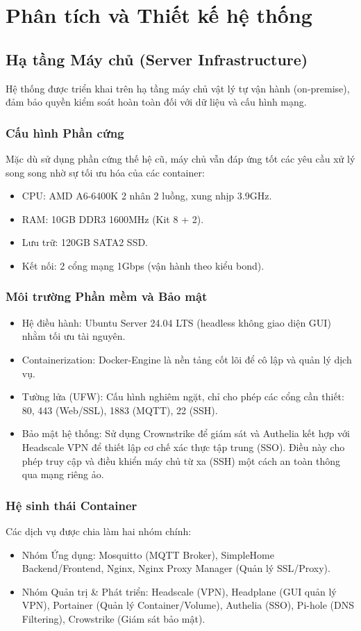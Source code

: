 \newpage
\section{Phân tích và Thiết kế hệ thống}

\subsection{Hạ tầng Máy chủ (Server Infrastructure)}
Hệ thống được triển khai trên hạ tầng máy chủ vật lý tự vận hành (on-premise), đảm bảo quyền kiểm soát hoàn toàn đối với dữ liệu và cấu hình mạng.
\subsubsection{Cấu hình Phần cứng}
Mặc dù sử dụng phần cứng thế hệ cũ, máy chủ vẫn đáp ứng tốt các yêu cầu xử lý song song nhờ sự tối ưu hóa của các container:
\begin{itemize}
    \item CPU: AMD A6-6400K 2 nhân 2 luồng, xung nhịp 3.9GHz.
    \item RAM: 10GB DDR3 1600MHz (Kit 8 + 2).
    \item Lưu trữ: 120GB SATA2 SSD.
    \item Kết nối: 2 cổng mạng 1Gbps (vận hành theo kiểu bond).
\end{itemize}
\subsubsection{Môi trường Phần mềm và Bảo mật}
\begin{itemize}
    \item Hệ điều hành: Ubuntu Server 24.04 LTS (headless không giao diện GUI) nhằm tối ưu tài nguyên.
    \item Containerization: Docker-Engine là nền tảng cốt lõi để cô lập và quản lý dịch vụ.
    \item Tường lửa (UFW): Cấu hình nghiêm ngặt, chỉ cho phép các cổng cần thiết: 80, 443 (Web/SSL), 1883 (MQTT), 22 (SSH).
    \item Bảo mật hệ thống: Sử dụng Crownstrike để giám sát và Authelia kết hợp với Headscale VPN để thiết lập cơ chế xác thực tập trung (SSO). Điều này cho phép truy cập và điều khiển máy chủ từ xa (SSH) một cách an toàn thông qua mạng riêng ảo.
\end{itemize}
\subsubsection{Hệ sinh thái Container}
Các dịch vụ được chia làm hai nhóm chính:
\begin{itemize}
    \item Nhóm Ứng dụng: Mosquitto (MQTT Broker), SimpleHome Backend/Frontend, Nginx, Nginx Proxy Manager (Quản lý SSL/Proxy).
    \item Nhóm Quản trị \& Phát triển: Headscale (VPN), Headplane (GUI quản lý VPN), Portainer (Quản lý Container/Volume), Authelia (SSO), Pi-hole (DNS Filtering), Crowstrike (Giám sát bảo mật).
\end{itemize}

